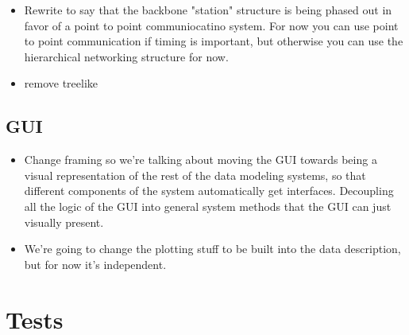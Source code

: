 \begin{itemize}
\item Rewrite to say that the backbone "station" structure is being phased out in favor of a point to point communiocatino system. For now you can use point to point communication if timing is important, but otherwise you can use the hierarchical networking structure for now.
\item remove treelike
\end{itemize}

\subsection{GUI}

\begin{itemize}
\item Change framing so we're talking about moving the GUI towards being a visual representation of the rest of the data modeling systems, so that different components of the system automatically get interfaces. Decoupling all the logic of the GUI into general system methods that the GUI can just visually present.
\item We're going to change the plotting stuff to be built into the data description, but for now it's independent.
\end{itemize}

\section{Tests}

